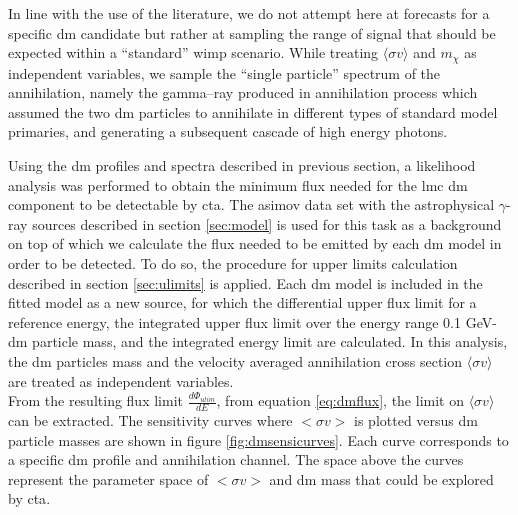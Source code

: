 \documentclass{article}
\newcommand{\sigv}{\langle \sigma v \rangle}
\newcommand{\mdm}{m_{\chi}}
\begin{document}
\par In line with the use of the literature, we do not attempt here at forecasts for a specific \gls{dm} candidate but rather at sampling the range of signal that should be expected within a ``standard'' \gls{wimp} scenario.
While treating $\sigv$ and $\mdm$ as independent variables, we sample the ``single particle'' spectrum of the annihilation, namely the gamma--ray produced in annihilation process which assumed the two \gls{dm} particles to annihilate in different types of standard model primaries, and generating a subsequent cascade of high energy photons. 

Using the \gls{dm} profiles and spectra described in previous section, a likelihood analysis was performed to obtain the minimum flux needed for the \gls{lmc} \gls{dm} component to be detectable by \gls{cta}. The asimov data set with the astrophysical $\gamma$-ray sources described in section \ref{sec:model} is used for this task as a background on top of which we calculate the flux needed to be emitted by each \gls{dm} model in order to be detected. To do so, the procedure for upper limits calculation described in section \ref{sec:ulimits} is applied. Each \gls{dm} model is included in the fitted model as a new source, for which the differential upper flux limit for a reference energy, the integrated upper flux limit over the energy range 0.1 GeV-\gls{dm} particle mass, and the integrated energy limit are calculated. In this analysis, the \gls{dm} particles mass and the velocity averaged annihilation cross section $\sigv$ are treated as independent variables. \\   
From the resulting flux  limit $\frac{d \Phi_{ulim}}{dE}$, from equation \ref{eq:dmflux}, the limit on $\sigv$ can be extracted. The sensitivity curves where $<\sigma v>$ is plotted versus \gls{dm} particle masses are shown in figure \ref{fig:dmsensicurves}. Each curve corresponds to a specific \gls{dm} profile and annihilation channel. The space above the curves represent the parameter space of $<\sigma v>$ and \gls{dm} mass that could be explored by \gls{cta}.
\end{document}
